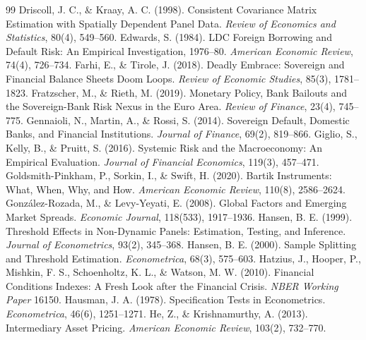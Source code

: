 \begin{thebibliography}{99}
 Driscoll, J. C., \& Kraay, A. C. (1998). Consistent Covariance Matrix Estimation with Spatially Dependent Panel Data. \textit{Review of Economics and Statistics}, 80(4), 549--560.
 Edwards, S. (1984). LDC Foreign Borrowing and Default Risk: An Empirical Investigation, 1976--80. \textit{American Economic Review}, 74(4), 726--734.
 Farhi, E., \& Tirole, J. (2018). Deadly Embrace: Sovereign and Financial Balance Sheets Doom Loops. \textit{Review of Economic Studies}, 85(3), 1781--1823.
 Fratzscher, M., \& Rieth, M. (2019). Monetary Policy, Bank Bailouts and the Sovereign-Bank Risk Nexus in the Euro Area. \textit{Review of Finance}, 23(4), 745--775.
 Gennaioli, N., Martin, A., \& Rossi, S. (2014). Sovereign Default, Domestic Banks, and Financial Institutions. \textit{Journal of Finance}, 69(2), 819--866.
 Giglio, S., Kelly, B., \& Pruitt, S. (2016). Systemic Risk and the Macroeconomy: An Empirical Evaluation. \textit{Journal of Financial Economics}, 119(3), 457--471.
 Goldsmith-Pinkham, P., Sorkin, I., \& Swift, H. (2020). Bartik Instruments: What, When, Why, and How. \textit{American Economic Review}, 110(8), 2586--2624.
 González-Rozada, M., \& Levy-Yeyati, E. (2008). Global Factors and Emerging Market Spreads. \textit{Economic Journal}, 118(533), 1917--1936.
 Hansen, B. E. (1999). Threshold Effects in Non-Dynamic Panels: Estimation, Testing, and Inference. \textit{Journal of Econometrics}, 93(2), 345--368.
 Hansen, B. E. (2000). Sample Splitting and Threshold Estimation. \textit{Econometrica}, 68(3), 575--603.
 Hatzius, J., Hooper, P., Mishkin, F. S., Schoenholtz, K. L., \& Watson, M. W. (2010). Financial Conditions Indexes: A Fresh Look after the Financial Crisis. \textit{NBER Working Paper} 16150.
 Hausman, J. A. (1978). Specification Tests in Econometrics. \textit{Econometrica}, 46(6), 1251--1271.
 He, Z., \& Krishnamurthy, A. (2013). Intermediary Asset Pricing. \textit{American Economic Review}, 103(2), 732--770.

\end{thebibliography}

